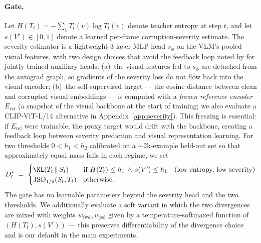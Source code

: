 \documentclass{article}
\newcommand{\JSD}{\mathrm{JSD}}
\newcommand{\teacher}{\pi_T}
\begin{document}
\paragraph{Gate.}
Let $H(T_t) = -\sum_v T_t(v) \log T_t(v)$ denote teacher entropy at step $t$, and let $s(V') \in [0,1]$ denote a learned per-frame corruption-severity estimate. The severity estimator is a lightweight 3-layer MLP head $s_\phi$ on the VLM's pooled visual features, with two design choices that avoid the feedback loop noted by \citet{tarvainen2017mean} for jointly-trained auxiliary heads: (a)~the visual features fed to $s_\phi$ are detached from the autograd graph, so gradients of the severity loss do not flow back into the visual encoder; (b)~the self-supervised target --- the cosine distance between clean and corrupted visual embeddings --- is computed with a \emph{frozen reference encoder} $E_{\text{ref}}$ (a snapshot of the visual backbone at the start of training; we also evaluate a CLIP-ViT-L/14 alternative in Appendix~\ref{app:severity}). This freezing is essential: if $E_{\text{ref}}$ were trainable, the proxy target would drift with the backbone, creating a feedback loop between severity prediction and visual representation learning. For two thresholds $0 < h_1 < h_2$ calibrated on a $\sim$2k-example held-out set so that approximately equal mass falls in each regime, we set
\begin{equation}
\label{eq:gate}
D^*_t \;=\;
\begin{cases}
\KL(T_t \,\|\, S_t) & \text{if } H(T_t) \le h_1 \,\wedge\, s(V') \le h_1 \quad \text{(low entropy, low severity)}\\
\JSD_{1/2}(S_t, T_t) & \text{otherwise.}
\end{cases}
\end{equation}
The gate has no learnable parameters beyond the severity head and the two thresholds. We additionally evaluate a soft variant in which the two divergences are mixed with weights $w_{\text{fwd}}, w_{\text{jsd}}$ given by a temperature-softmaxed function of $(H(T_t), s(V'))$ --- this preserves differentiability of the divergence choice and is our default in the main experiments.


\end{document}
